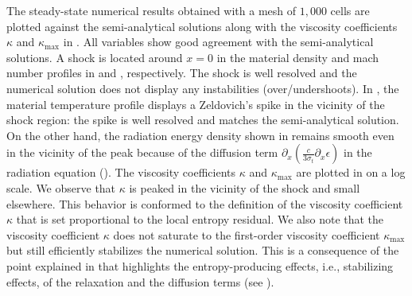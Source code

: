 \documentclass[times,doublespace]{fldauth}%
\begin{document}
The steady-state numerical results obtained with a mesh of $1,000$ cells are plotted against the semi-analytical solutions %
along with the viscosity coefficients $\kappa$ and $\kappa_\text{max}$ in . All variables show good agreement with the semi-analytical solutions. A shock is located around $x=0$ in the material density and mach number profiles in  and , respectively. The shock is well resolved and the numerical solution does not display any instabilities (over/undershoots). In , the material temperature profile displays a Zeldovich's spike in the vicinity of the shock region: the spike is well resolved and matches the semi-analytical solution. On the other hand, the radiation energy density shown in  remains smooth even in the vicinity of the peak because of the diffusion term $ \partial_x \left( \frac{c}{3 \sigma_t} \partial_x \epsilon \right)$ in the radiation equation (). The viscosity coefficients $\kappa$ and $\kappa_\text{max}$ are plotted in  on a log scale. We observe that $\kappa$ is peaked in the vicinity of the shock and small elsewhere. This behavior is conformed to the definition of the viscosity coefficient $\kappa$ that is set proportional to the local entropy residual. We also note that the viscosity coefficient $\kappa$ does not saturate to the first-order viscosity coefficient $\kappa_\text{max}$ but still efficiently stabilizes the numerical solution. This is a consequence of the point explained in  that highlights the entropy-producing effects, i.e., stabilizing effects, of the relaxation and the diffusion terms (see ).
\end{document}
